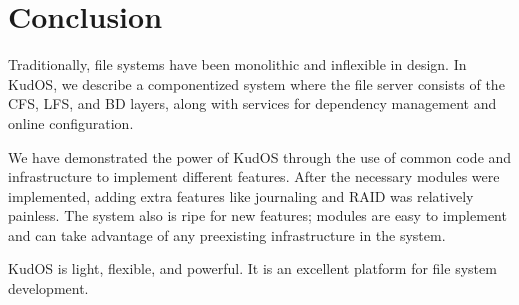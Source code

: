 \section{Conclusion}
\label{sec:conclusion}

Traditionally, file systems have been monolithic and inflexible in design. In
KudOS, we describe a componentized system where the file server consists of the
CFS, LFS, and BD layers, along with services for dependency management and
online configuration. 

We have demonstrated the power of KudOS through the use of common code
and infrastructure to implement different features. After the
necessary modules were implemented, adding extra features like
journaling and RAID was relatively painless. The system also is ripe
for new features; modules are easy to implement and can take advantage
of any preexisting infrastructure in the system.

KudOS is light, flexible, and powerful. It is an excellent platform
for file system development.
